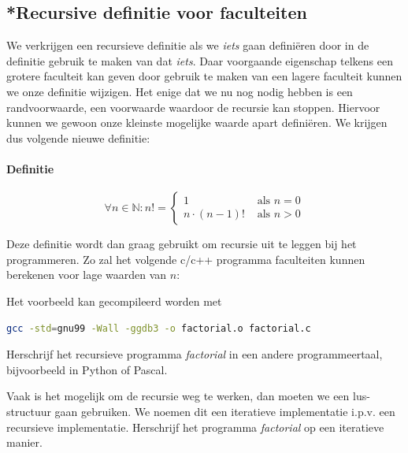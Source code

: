 \documentclass[12pt,a4paper,twoside]{article}
\begin{document}
\subsection{*Recursive definitie voor faculteiten}

We verkrijgen een recursieve definitie als we {\em iets} gaan definiëren door in de definitie gebruik te maken van dat {\em iets}. Daar voorgaande eigenschap telkens een grotere faculteit kan geven door gebruik te maken van een lagere faculteit kunnen we onze definitie wijzigen. Het enige dat we nu nog nodig hebben is een randvoorwaarde, een voorwaarde waardoor de recursie kan stoppen. Hiervoor kunnen we gewoon onze kleinste mogelijke waarde apart definiëren. We krijgen dus volgende nieuwe definitie:

\paragraph*{Definitie}
\begin{mdframed}
  \[\forall n \in \mathbb{N} : n!=
    \begin{cases}
      1        &\mbox{ als } n=0\\
      n \cdot (n-1)! &\mbox{ als } n>0
    \end{cases}
  \]
\end{mdframed}

Deze definitie wordt dan graag gebruikt om recursie uit te leggen bij het programmeren. Zo zal het volgende c/c++ programma faculteiten kunnen berekenen voor lage waarden van $n$:




Het voorbeeld kan gecompileerd worden met
\begin{lstlisting}[language=bash]
  gcc -std=gnu99 -Wall -ggdb3 -o factorial.o factorial.c
\end{lstlisting}

\begin{oefening}
Herschrijf het recursieve programma {\em factorial} in een andere programmeertaal, bijvoorbeeld in Python of Pascal.
\end{oefening}

\begin{oefening}
Vaak is het mogelijk om de recursie weg te werken, dan moeten we een lus-structuur gaan gebruiken. We noemen dit een iteratieve implementatie i.p.v. een recursieve implementatie. Herschrijf het programma {\em factorial} op een iteratieve manier.
\end{oefening}
\end{document}

